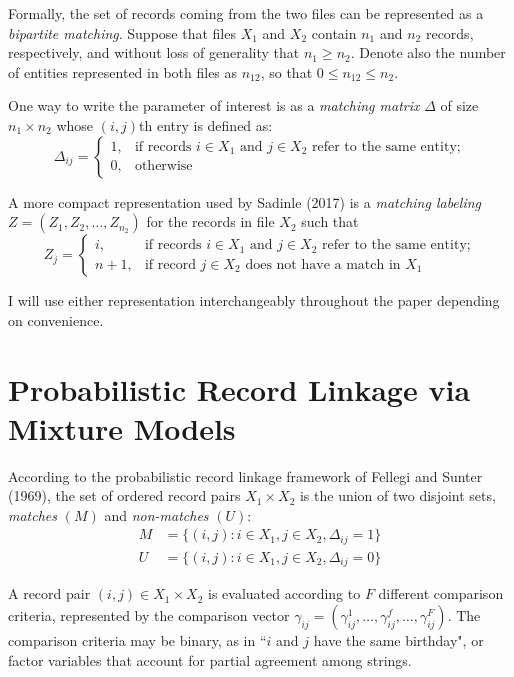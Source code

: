 \documentclass[11pt,reqno]{amsart}
\begin{document}
Formally, the set of records coming from the two files can be represented as a \textit{bipartite matching}.  Suppose that files $X_1$ and $X_2$ contain $n_1$ and $n_2$ records, respectively, and without loss of generality that $n_1 \geq n_2$.  Denote also the number of entities represented in both files as $n_{12}$, so that $0 \leq n_{12} \leq n_2$. 

One way to write the parameter of interest is as a \textit{matching matrix} $\Delta$ of size $n_1\times n_2$ whose $(i,j)$th entry is defined as:
\[ \Delta_{ij} = \begin{cases} 1, & \text{if records $i\in X_1$ and $j\in X_2$ refer to the same entity;} \\ 0, & \text{otherwise} \end{cases} \]

A more compact representation used by Sadinle (2017) is a \textit{matching labeling} $Z= (Z_1, Z_2,\dots, Z_{n_2})$ for the records in file $X_2$ such that
\[ Z_j = \begin{cases} i, & \text{if records $i\in X_1$ and $j\in X_2$ refer to the same entity;} \\
				n+1, & \text{if record $j\in X_2$ does not have a match in $X_1$} \end{cases} \]

I will use either representation interchangeably throughout the paper depending on convenience. 




\section{Probabilistic Record Linkage via Mixture Models}
According to the probabilistic record linkage framework of Fellegi and Sunter (1969), the set of ordered record pairs $X_1 \times X_2$ is the union of two disjoint sets, \textit{matches} $(M)$ and \textit{non-matches} $(U)$:
\begin{align*} M &= \{(i,j): i\in X_1, j\in X_2, \Delta_{ij}=1\} \\ U &= \{(i,j): i\in X_1, j\in X_2, \Delta_{ij}=0\}\end{align*} 

A record pair $(i,j) \in X_1\times X_2$ is evaluated according to $F$ different comparison criteria, represented by the comparison vector $\gamma_{ij}= (\gamma_{ij}^1, \dots, \gamma_{ij}^f, \dots, \gamma_{ij}^F)$.  The comparison criteria may be binary, as in ``$i$ and $j$ have the same birthday", or factor variables that account for partial agreement among strings.    
\end{document}
